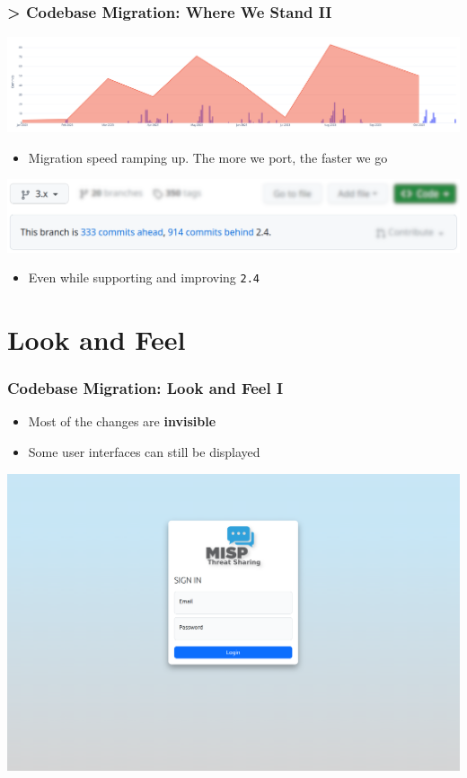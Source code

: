 \begin{frame}
    \frametitle{> Codebase Migration: Where We Stand II}
    \begin{center}
        \includegraphics[width=1\linewidth]{pictures/ramping-up.png}
    \end{center}
    \begin{itemize}
        \item Migration speed ramping up. The more we port, the faster we go
    \end{itemize}
    \begin{center}
        \includegraphics[width=1\linewidth]{pictures/catering-to-2.4.png}
    \end{center}
    \begin{itemize}
        \item Even while supporting and improving \texttt{2.4}
    \end{itemize}
\end{frame}

\section{Look and Feel}
\begin{frame}
    \frametitle{Codebase Migration: Look and Feel I}
    \begin{itemize}
        \item Most of the changes are \textbf{invisible}
        \item Some user interfaces can still be displayed
    \end{itemize}
    \begin{center}
        \includegraphics[width=0.8\linewidth]{pictures/login-screen.png}
    \end{center}
\end{frame}

